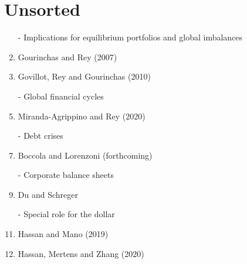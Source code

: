 \documentclass[12pt,letter]{article}
\theoremstyle{break} \theorembodyfont{\normalfont\itshape}
\theoremstyle{break}
\theoremstyle{break} \theorembodyfont{\normalfont\itshape}
\theoremstyle{break} \theorembodyfont{\normalfont\itshape}
\begin{document}
\section{Unsorted}
\begin{enumerate}
\item[-] Implications for equilibrium portfolios and global imbalances
\item Gourinchas and Rey (2007)
\item Govillot, Rey and Gourinchas (2010)
\item[-] Global financial cycles
\item Miranda-Agrippino and Rey (2020)
\item[-] Debt crises
\item Boccola and Lorenzoni (forthcoming)
\item[-] Corporate balance sheets
\item Du and Schreger
\item[-] Special role for the dollar
\item Hassan and Mano (2019)
\item Hassan, Mertens and Zhang (2020)
\end{enumerate}
\end{document}
